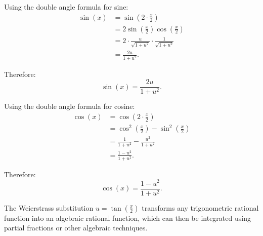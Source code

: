 Using the double angle formula for sine:
\begin{align*}
    \sin(x) &= \sin\left( 2 \cdot \frac{x}{2} \right)\\
     &= 2 \sin\left( \frac{x}{2} \right) \cos\left( \frac{x}{2} \right)\\
     &= 2 \cdot \frac{u}{\sqrt{1+u^2}} \cdot \frac{1}{\sqrt{1+u^2}}\\
     &= \frac{2u}{1+u^2}.
\end{align*}

Therefore:
\begin{equation}
    \boxed{ \sin(x) = \frac{2u}{1+u^2} }. \label{eqn:6/21/25/5}
\end{equation}

Using the double angle formula for cosine:
\begin{align*}
    \cos(x) &= \cos\left( 2 \cdot \frac{x}{2} \right)\\
    &= \cos^2\left( \frac{x}{2} \right) - \sin^2\left( \frac{x}{2} \right)\\
    &= \frac{1}{1+u^2} - \frac{u^2}{1+u^2}\\
    &= \frac{1-u^2}{1+u^2}.
\end{align*}

Therefore:
\begin{equation}
    \boxed{ \cos(x) = \frac{1-u^2}{1+u^2} }. \label{eqn:6/21/25/6}
\end{equation}


The Weierstrass substitution $u = \tan\left( \frac{x}{2} \right)$ transforms any trigonometric rational function into an algebraic rational function, which can then be integrated using partial fractions or other algebraic techniques.

